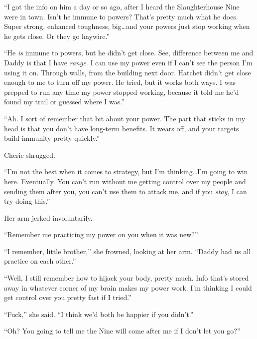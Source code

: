 ``I got the info on him a day or so ago, after I heard the Slaughterhouse Nine were in town.  Isn't he immune to powers?  That's pretty much what he does.  Super strong, enhanced toughness, big\ldots and your powers just stop working when he gets close.  Or they go haywire.''



``He \emph{is} immune to powers, but he didn't get close.  See, difference between me and Daddy is that I have \emph{range}.  I can use my power even if I can't see the person I'm using it on.  Through walls, from the building next door.  Hatchet didn't get close enough to me to turn off my power.  He tried, but it works both ways.  I was prepped to run any time my power stopped working, because it told me he'd found my trail or guessed where I was.''



``Ah.  I sort of remember that bit about your power.  The part that sticks in my head is that you don't have long-term benefits.  It wears off, and your targets build immunity pretty quickly.''



Cherie shrugged.



``I'm not the best when it comes to strategy, but I'm thinking\ldots I'm going to win here. Eventually.  You can't run without me getting control over my people and sending them after you, you can't use them to attack me, and if you \emph{stay}, I can try doing this.''



Her arm jerked involuntarily.



``Remember me practicing my power on you when it was new?''



``I remember, little brother,'' she frowned, looking at her arm.  ``Daddy had us all practice on each other.''



``Well, I still remember how to hijack your body, pretty much.  Info that's stored away in whatever corner of my brain makes my power work.  I'm thinking I could get control over you pretty fast if I tried.''



``Fuck,'' she said.  ``I think we'd both be happier if you didn't.''



``Oh?  You going to tell me the Nine will come after me if I don't let you go?''



